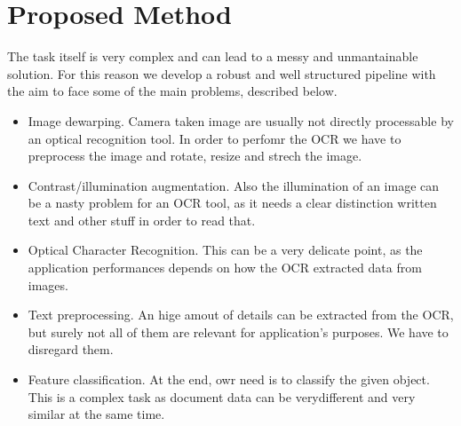 \documentclass[10pt,twocolumn,letterpaper]{article}
\begin{document}

\section{Proposed Method}
\label{sec:proposed-method}

The task itself is very complex and can lead to a messy and
unmantainable solution. For this reason we develop a robust and well
structured pipeline with the aim to face some of the main problems,
described below.
\begin{itemize}
	\item Image dewarping. Camera taken image are usually not directly
	processable by an optical recognition tool. In order to perfomr
	the OCR we have to preprocess the image and rotate, resize and
	strech the image.
	\item Contrast/illumination augmentation. Also the illumination of an
	image can be a nasty problem for an OCR tool, as it needs a clear
	distinction written text and other stuff in order to read that.
	\item Optical Character Recognition. This can be a very delicate
	point, as the application performances depends on how the OCR
	extracted data from images.
	\item Text preprocessing. An hige amout of details can be extracted
	from the OCR, but surely not all of them are relevant for
	application's purposes. We have to disregard them.
	\item Feature classification. At the end, owr need is to classify the
	given object. This is a complex task as document data can be verydifferent and very similar at the same time.
\end{itemize}
\end{document}
